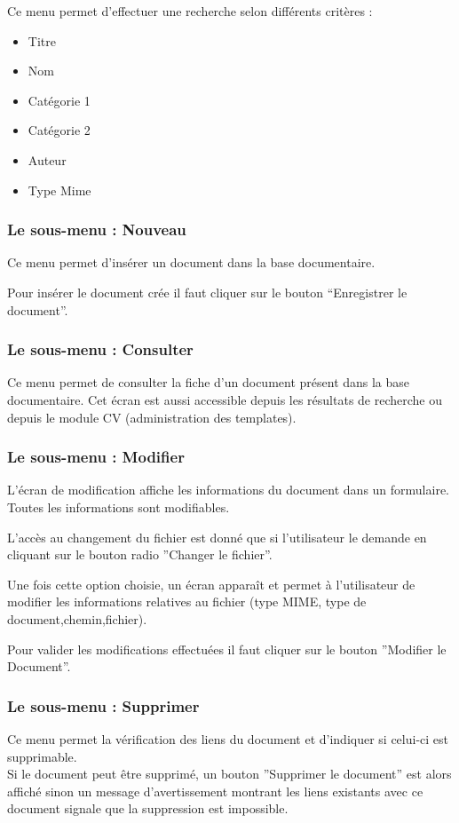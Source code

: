 Ce menu permet d'effectuer une recherche selon différents critères :

\begin{itemize}
\item Titre
\item Nom
\item Catégorie 1
\item Catégorie 2
\item Auteur
\item Type Mime
\end{itemize}


\subsubsection{Le sous-menu : Nouveau}

Ce menu permet d'insérer un document dans la base documentaire.

Pour insérer le document crée il faut cliquer sur le bouton ``Enregistrer le document''.

\subsubsection{Le sous-menu : Consulter}

Ce menu permet de consulter la fiche d'un document présent dans la base documentaire.
Cet écran est aussi accessible depuis les résultats de recherche ou depuis le module CV (administration des templates).

\subsubsection{Le sous-menu : Modifier}

L'écran de modification affiche les informations du document dans un formulaire.
Toutes les informations sont modifiables.

L'accès au changement du fichier est donné que si l'utilisateur le demande en cliquant sur le bouton radio ''Changer le fichier''.

Une fois cette option choisie, un écran apparaît et permet à l'utilisateur de modifier les informations relatives au fichier (type MIME, type de document,chemin,fichier).

Pour valider les modifications effectuées il faut cliquer sur le bouton ''Modifier le Document''.

\subsubsection{Le sous-menu : Supprimer}
Ce menu permet la vérification des liens du document et d'indiquer si celui-ci est supprimable.\\
Si le document peut être supprimé, un bouton ''Supprimer le document'' est alors affiché sinon un message d'avertissement montrant les liens existants avec ce document signale que la suppression est impossible.

